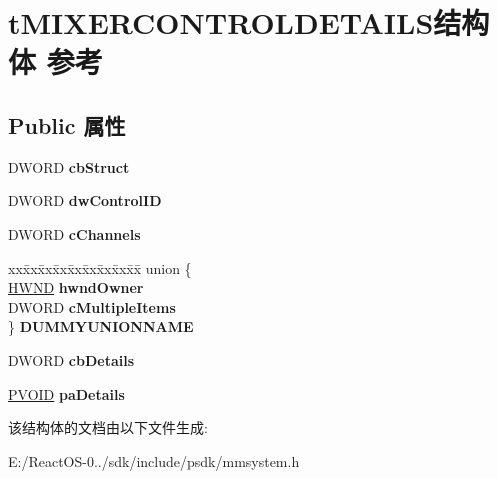 \hypertarget{structt_m_i_x_e_r_c_o_n_t_r_o_l_d_e_t_a_i_l_s}{}\section{t\+M\+I\+X\+E\+R\+C\+O\+N\+T\+R\+O\+L\+D\+E\+T\+A\+I\+L\+S结构体 参考}
\label{structt_m_i_x_e_r_c_o_n_t_r_o_l_d_e_t_a_i_l_s}
\subsection*{Public 属性}
\begin{DoxyCompactItemize}
\item 
\mbox{\label{structt_m_i_x_e_r_c_o_n_t_r_o_l_d_e_t_a_i_l_s_ae785b8ae72c800e0af003dcd48240197}} 
D\+W\+O\+RD {\bfseries cb\+Struct}
\item 
\mbox{\label{structt_m_i_x_e_r_c_o_n_t_r_o_l_d_e_t_a_i_l_s_a377d843b16bb65c39a91687e8342fc6b}} 
D\+W\+O\+RD {\bfseries dw\+Control\+ID}
\item 
\mbox{\label{structt_m_i_x_e_r_c_o_n_t_r_o_l_d_e_t_a_i_l_s_a0e83589a6bf85a7f46d64f1071c1e681}} 
D\+W\+O\+RD {\bfseries c\+Channels}
\item 
\mbox{\label{structt_m_i_x_e_r_c_o_n_t_r_o_l_d_e_t_a_i_l_s_a5bde6aae436e2318dfdf229238b183d4}} 
\begin{tabbing}
xx\=xx\=xx\=xx\=xx\=xx\=xx\=xx\=xx\=\kill
union \{\\
\>\hyperlink{interfacevoid}{HWND} {\bfseries hwndOwner}\\
\>DWORD {\bfseries cMultipleItems}\\
\} {\bfseries DUMMYUNIONNAME}\\

\end{tabbing}\item 
\mbox{\label{structt_m_i_x_e_r_c_o_n_t_r_o_l_d_e_t_a_i_l_s_a7fd2d179909a5d36be210a91482e0304}} 
D\+W\+O\+RD {\bfseries cb\+Details}
\item 
\mbox{\label{structt_m_i_x_e_r_c_o_n_t_r_o_l_d_e_t_a_i_l_s_a1cea1fad129a9233cea276819229b899}} 
\hyperlink{interfacevoid}{P\+V\+O\+ID} {\bfseries pa\+Details}
\end{DoxyCompactItemize}


该结构体的文档由以下文件生成\+:\begin{DoxyCompactItemize}
\item 
E\+:/\+React\+O\+S-\/0../sdk/include/psdk/mmsystem.\+h\end{DoxyCompactItemize}

